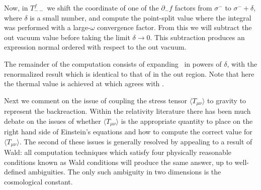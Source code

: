 Now, in $T^{f}_{--}$ we shift the coordinate of
one of the $\partial_{-} f$ factors from
$\sigma^{-}$ to
$\sigma^{-} +\delta$, where $\delta$ is a small number, and
compute the point-split value
%
\eqn{}
%
where the integral was performed with a large-$\omega$ convergence
factor.
{}From this we will subtract the out vacuum value
%
\eqn{}
%
before taking the limit $\delta\rightarrow 0$.  This subtraction produces
an expression normal ordered with respect to the out vacuum.

The remainder of the computation  consists of expanding
\psplit\ in powers of $\delta$, with the renormalized result
%
\eqn{}
%
which is identical to that of   in the out region.
Note that here the thermal value is achieved at
%
\eqn{}
%
which agrees with \Appr.

Next we comment on the issue of coupling the stress tensor
$\langle T_{\mu\nu}\rangle$ to
gravity to represent the backreaction.
Within the relativity literature there has been much debate on the issues
of whether $\langle T_{\mu\nu}\rangle$ is the appropriate quantity to place
on the right hand side of Einstein's equations
and how to compute the correct value for $\langle T_{\mu\nu}\rangle$.
The second of these issues is generally resolved by appealing to a result of
Wald: all
computation techniques which satisfy
 four physically reasonable conditions known as
Wald conditions will produce the same answer, up to well-defined
ambiguities.
The only such ambiguity in two dimensions is the cosmological
constant.

